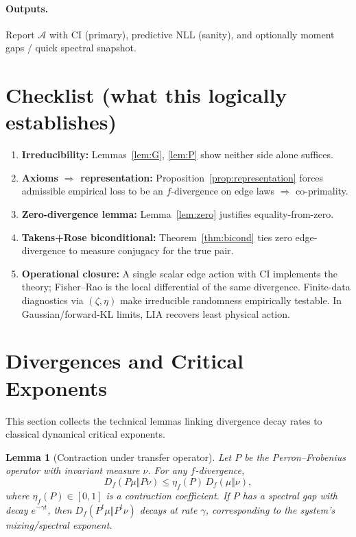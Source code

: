 \documentclass[11pt]{article}
\newtheorem{lemma}{Lemma}
\newcommand{\1}{\mathbf{1}}
\begin{document}
\paragraph{Outputs.}
Report \(\mathcal A\) with CI (primary), predictive NLL (sanity), and optionally moment gaps / quick spectral snapshot. 

\section{Checklist (what this logically establishes)}
\begin{enumerate}[leftmargin=2em,itemsep=2pt,topsep=2pt]
\item \textbf{Irreducibility:} Lemmas~\ref{lem:G}, \ref{lem:P} show neither side alone suffices.
\item \textbf{Axioms $\Rightarrow$ representation:} Proposition~\ref{prop:representation} forces admissible empirical loss to be an \(f\)-divergence on edge laws $\Rightarrow$ co-primality.
\item \textbf{Zero-divergence lemma:} Lemma~\ref{lem:zero} justifies equality-from-zero.
\item \textbf{Takens+Rose biconditional:} Theorem~\ref{thm:bicond} ties zero edge-divergence to measure conjugacy for the true pair.
\item \textbf{Operational closure:} A single scalar edge action with CI implements the theory; Fisher--Rao is the local differential of the same divergence. Finite-data diagnostics via \((\zeta,\eta)\) make irreducible randomness empirically testable. In Gaussian/forward-KL limits, LIA recovers least physical action.
\end{enumerate}

\nocite{*}


\appendix

\section{Divergences and Critical Exponents}
\label{app:exponents}

This section collects the technical lemmas linking divergence decay rates to classical
dynamical critical exponents.

\begin{lemma}[Contraction under transfer operator]
Let $P$ be the Perron–Frobenius operator with invariant measure $\nu$. For any $f$-divergence,
\[
D_f(P\mu \Vert P\nu) \le \eta_f(P)\, D_f(\mu \Vert \nu),
\]
where $\eta_f(P)\in[0,1]$ is a contraction coefficient. If $P$ has a spectral gap with decay $e^{-\gamma t}$, then $D_f(P^t\mu\Vert P^t\nu)$ decays at rate $\gamma$, corresponding to the system's mixing/spectral exponent.
\end{lemma}
\end{document}
